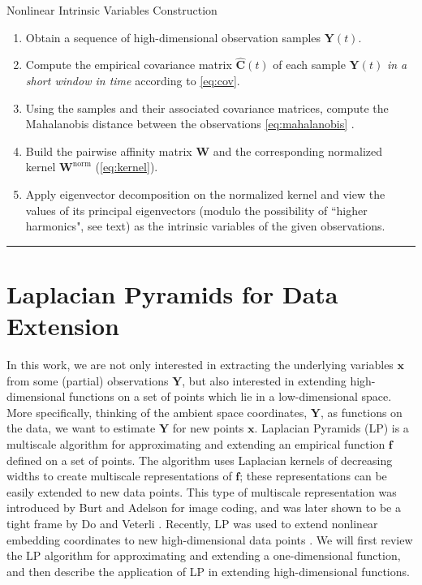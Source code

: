 \documentclass[aip,jcp,preprint]{revtex4-1}
\begin{document}
\begin{algorithm}[th!]
\caption{Nonlinear Intrinsic Variables Construction}
\begin{enumerate}

\item
Obtain a sequence of high-dimensional observation samples $\mathbf{Y}(t)$.

\item
Compute the empirical covariance matrix $\widehat{\mathbf{C}}(t)$ of each sample $\mathbf{Y}(t)$ {\em in a short window in time} according to \eqref{eq:cov}.

\item
Using the samples and their associated covariance matrices, compute the Mahalanobis distance between the observations \eqref{eq:mahalanobis} .

\item
Build the pairwise affinity matrix $\mathbf{W}$ and the corresponding normalized kernel $\mathbf{W}^{\mathrm{norm}}$ (\ref{eq:kernel}).

\item
Apply eigenvector decomposition on the normalized kernel and view the values of its principal eigenvectors (modulo the possibility of
 ``higher harmonics", see text) as the intrinsic variables of the given observations.

\end{enumerate}
\hrule
\label{algo}
\end{algorithm}

\section{Laplacian Pyramids for Data Extension} \label{sec:LapPyr}

In this work, we are not only interested in extracting the underlying variables $\mathbf{x}$ from some (partial) observations $\mathbf{Y}$,
but also interested in extending high-dimensional functions on a set of points which lie in a low-dimensional space.
%
More specifically, thinking of the ambient space coordinates, $\mathbf{Y}$, as functions on the data,
we want to estimate $\mathbf{Y}$ for new points $\mathbf{x}$.
%
Laplacian Pyramids (LP) is a multiscale algorithm for approximating and extending an empirical function $\mathbf{f}$ defined on a set of points.
%
The algorithm uses Laplacian kernels of decreasing widths to create multiscale representations of $\mathbf{f}$;
these representations can be easily extended to new data points.
%
This type of multiscale representation was introduced by Burt and Adelson \cite{burt1983laplacian} for image coding,
and was later shown to be a tight frame by Do and Veterli \cite{do2003framing}.
%
Recently, LP was used to extend nonlinear embedding coordinates to new high-dimensional data points \cite{rabin2012heterogeneous}.
%
%
We will first review the LP algorithm for approximating and extending a one-dimensional function,
and then describe the application of LP in extending high-dimensional functions.
\end{document}
